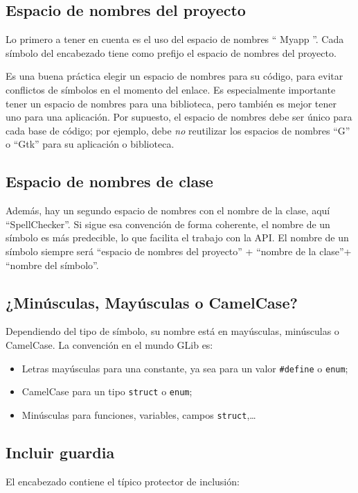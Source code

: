 \subsection{Espacio de nombres del proyecto}
Lo primero a tener en cuenta es el uso del espacio de nombres `` Myapp ''. Cada símbolo del encabezado tiene como prefijo el espacio de nombres del proyecto.

Es una buena práctica elegir un espacio de nombres para su código, para evitar conflictos de símbolos en el momento del enlace. Es especialmente importante tener un espacio de nombres para una biblioteca, pero también es mejor tener uno para una aplicación. Por supuesto, el espacio de nombres debe ser único para cada base de código; por ejemplo, debe \emph{no} reutilizar los espacios de nombres ``G'' o ``Gtk'' para su aplicación o biblioteca.

\subsection{Espacio de nombres de clase}
Además, hay un segundo espacio de nombres con el nombre de la clase, aquí ``SpellChecker''. Si sigue esa convención de forma coherente, el nombre de un símbolo es más predecible, lo que facilita el trabajo con la API. El nombre de un símbolo siempre será ``espacio de nombres del proyecto'' + ``nombre de la clase''+ ``nombre del símbolo''.

\subsection{¿Minúsculas, Mayúsculas o CamelCase?}
Dependiendo del tipo de símbolo, su nombre está en mayúsculas, minúsculas o CamelCase. La convención en el mundo GLib es:
\begin{itemize}
    \item Letras mayúsculas para una constante, ya sea para un valor \lstinline{#define} o \lstinline{enum};
    \item CamelCase para un tipo \lstinline{struct} o \lstinline{enum};
    \item Minúsculas para funciones, variables, campos \lstinline{struct},…
\end{itemize}

\subsection{Incluir guardia}
El encabezado contiene el típico protector de inclusión:

